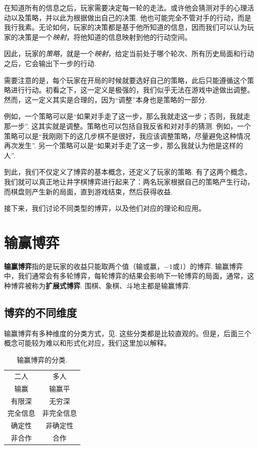 在知道所有的信息之后，玩家需要决定每一轮的走法。或许他会猜测对手的心理活动以及策略，并以此为根据做出自己的决策. 他也可能完全不管对手的行动，而是我行我素。无论如何，玩家的决策都是基于他所知道的信息，因而我们可以认为玩家的决策是一个\emph{映射}，将他知道的信息映射到他的行动空间。

因此，玩家的\emph{策略}，就是一个\emph{映射}，给定当前处于哪个轮次、所有历史局面和行动之后，它会输出下一步的行动. 

需要注意的是，每个玩家在开局的时候就要选好自己的策略，此后只能遵循这个策略进行行动。初看之下，这一定义是极强的，我们似乎无法在游戏中途做出调整。然而，这一定义其实是合理的，因为“调整”本身也是策略的一部分. 

例如，一个策略可以是“如果对手走了这一步，那么我就走这一步；否则，我就走那一步”. 这其实就是调整。策略也可以包括自我反省和对对手的猜测. 例如，一个策略可以是“我刚刚下的这几步棋不是很好，我应该调整策略，尽量避免这种情况再次发生”. 另一个策略可以是“如果对手走了这一步，那么我就认为他是这样的人”.

到此，我们不仅定义了博弈的基本概念，还定义了玩家的策略. 有了这两个概念，我们就可以真正地让井字棋博弈进行起来了：两名玩家根据自己的策略产生行动，而棋盘则产生新的局面，直到游戏结束，然后获得收益. 

接下来，我们讨论不同类型的博弈，以及他们对应的理论和应用。

\section{输赢博弈}

\textbf{输赢博弈}指的是玩家的收益只能取两个值（输或赢，$-1$或$1$）的博弈. 输赢博弈中，我们通常会有多轮博弈，每轮博弈的结果会影响下一轮博弈的局面，通常，这种博弈被称为\textbf{扩展式博弈}. 围棋、象棋、斗地主都是输赢博弈. 

\subsection{博弈的不同维度}

输赢博弈有多种维度的分类方式，见. 这些分类都是比较直观的。但是，后面三个概念可能较为难以和形式化对应，我们这里加以解释。

\begin{table}[ht]
    \centering
    \begin{tabular}{cc}
        二人 & 多人 \\
        输赢 & 输赢平\\
        有限深 & 无穷深 \\
        完全信息 & 非完全信息 \\
        确定性 & 非确定性 \\
        非合作 & 合作
    \end{tabular}
    \caption{输赢博弈的分类.}
    \label{tab:win-lose-game}
\end{table}

